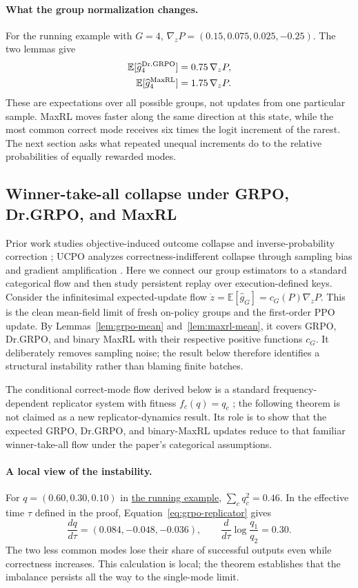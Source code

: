 \documentclass{article}
\newcommand{\1}{\mathbf 1}
\newcommand{\E}{\mathbb E}
\theoremstyle{remark}
\theoremstyle{definition}
\theoremstyle{plain}
\begin{document}
\paragraph{What the group normalization changes.}
For the running example with $G=4$,
$\nabla_zP=(0.15,0.075,0.025,-0.25)$. The two lemmas give
\[
 \begin{aligned}
 \mathbb E[\widehat g_4^{\rm Dr.GRPO}]&=0.75\,\nabla_zP,\\
 \mathbb E[\widehat g_4^{\rm MaxRL}]&=1.75\,\nabla_zP.
 \end{aligned}
\]
These are expectations over all possible groups, not updates from one
particular sample. MaxRL moves faster along the same direction at this
state, while the most common correct mode receives six times the logit
increment of the rarest. The next section asks what repeated unequal
increments do to the relative probabilities of equally rewarded modes.

\subsection{Winner-take-all collapse under GRPO, Dr.GRPO, and MaxRL}
\label{app:theory-collapse}

Prior work studies objective-induced outcome collapse and inverse-probability
correction \citep{sinha2026expected}; UCPO analyzes correctness-indifferent collapse
through sampling bias and gradient amplification \citep[Section~4]{lochab2026ucpo}.
Here we connect our group estimators to a standard categorical flow and then study
persistent replay over execution-defined keys.
Consider the infinitesimal expected-update flow
$\dot z=\E[\widehat g_G]=c_G(P)\nabla_zP$. This is the clean mean-field limit
of fresh on-policy groups and the first-order PPO update. By Lemmas~\ref{lem:grpo-mean} and~\ref{lem:maxrl-mean}, it covers GRPO, Dr.GRPO, and binary MaxRL with their respective positive functions $c_G$. It deliberately
removes sampling noise; the result below therefore identifies a structural
instability rather than blaming finite batches.

The conditional correct-mode flow derived below is a standard
frequency-dependent replicator system with fitness $f_c(q)=q_c$
\citep{hofbauer1998evolutionary}; the following
theorem is not claimed as a new replicator-dynamics result. Its role is to show
that the expected GRPO, Dr.GRPO, and binary-MaxRL updates reduce to that
familiar winner-take-all flow under the paper's categorical assumptions.

\paragraph{A local view of the instability.}
For $q=(0.60,0.30,0.10)$ in \hyperref[ex:theory-running]{the running example},
$\sum_cq_c^2=0.46$. In the effective time $\tau$ defined in the proof,
Equation~\eqref{eq:grpo-replicator} gives
\[
 \frac{dq}{d\tau}=(0.084,-0.048,-0.036),\qquad
 \frac{d}{d\tau}\log\frac{q_1}{q_2}=0.30.
\]
The two less common modes lose their share of successful outputs even while
correctness increases. This calculation is local; the theorem establishes
that the imbalance persists all the way to the single-mode limit.
\end{document}
